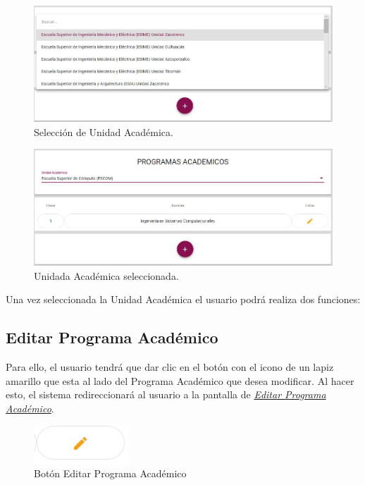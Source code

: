          \begin{figure}[H]
                \centering
                \hypertarget{prede}{\includegraphics[width=0.7\linewidth]{images/SP3/seleccion}}
                \caption{Selección de Unidad Académica.}
                \label{predes}
            \end{figure}

            \begin{figure}[H]
                \centering
                \hypertarget{predess}{\includegraphics[width=0.7\linewidth]{images/SP3/otraua}}
                \caption{Unidada Académica seleccionada.}
                \label{predess}
            \end{figure}

         Una vez seleccionada la Unidad Académica el usuario  podrá realiza dos funciones:
	    \subsection{Editar Programa Académico}

        	Para ello, el usuario tendrá que dar clic en el botón con el icono de un lapiz amarillo que esta al lado del Programa Académico que desea modificar. Al hacer esto, el sistema redireccionará al usuario a la pantalla de \hyperlink{editarpa}{\textit{Editar Programa Académico}}.

        	\begin{figure}[H]
        		\centering
        		\hypertarget{editar}{\includegraphics[width=0.7\linewidth]{images/SP3/BtnEditar}}
        		\caption{Botón Editar Programa Académico}
        		\label{editar}
        	\end{figure}

